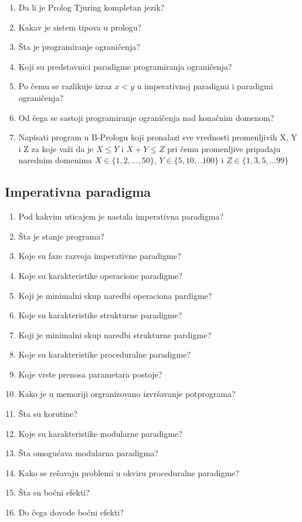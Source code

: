 \documentclass[main.tex]{subfiles}
\begin{document}
\begin{multicols}{2}
\begin{enumerate}
\item Da li je Prolog Tjuring kompletan jezik?
\item Kakav je sistem tipova u prologu?
\item Šta je programiranje ograničenja?
\item Koji su predstavnici paradigme programiranja ograničenja?
\item Po čemu se razlikuje izraz $ x < y$ u imperativnoj paradigmi i paradigmi
ograničenja?
\item Od čega se sastoji programiranje ograničenja nad konačnim domenom?
\item Napisati program u B-Prologu koji pronalazi sve vrednosti promenljivih
X, Y i Z za koje važi da je $X \le Y$ i $X + Y \le Z$ pri čemu promenljive
pripadaju narednim domenima $X \in \{1, 2, ..., 50\}$, $Y \in \{5, 10, ..100\}$ i $Z \in
\{1, 3, 5, ...99\}$
\end{enumerate}

\subsection{Imperativna paradigma}
\begin{enumerate}
\item Pod kakvim uticajem je nastala imperativna paradigma?
\item Šta je stanje programa?
\item Koje su faze razvoja imperativne paradigme?
\item Koje su karakteristike operacione paradigme?
\item Koji je minimalni skup naredbi operaciona pardigme?
\item Koje su karakteristike strukturne paradigme?
\item Koji je minimalni skup naredbi strukturne pardigme?
\item Koje su karakteristike proceduralne paradigme?
\item Koje vrste prenosa parametara postoje?
\item Kako je u memoriji orgranizovano izvršavanje potprograma?
\item Šta su korutine?
\item Koje su karakteristike modularne paradigme?
\item Šta omogućava modularna paradigma?
\item Kako se rešavaju problemi u okviru proceduralne paradigme?
\item Šta su bočni efekti?
\item Do čega dovode bočni efekti?
\end{enumerate}


\end{multicols}
\end{document}
